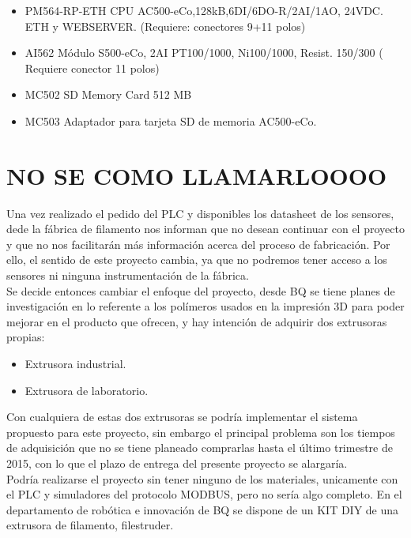 \begin{itemize}
	\item{PM564-RP-ETH CPU AC500-eCo,128kB,6DI/6DO-R/2AI/1AO, 24VDC. ETH y WEBSERVER. (Requiere: conectores 9+11 polos)}
	\item{AI562 Módulo S500-eCo, 2AI PT100/1000, Ni100/1000, Resist. 150/300 ( Requiere conector 11 polos)}
	\item{MC502 SD Memory Card 512 MB}
	\item{MC503 Adaptador para tarjeta SD de memoria AC500-eCo.}
\end{itemize}

\section{NO SE COMO LLAMARLOOOO}
\label{}

Una vez realizado el pedido del PLC y disponibles los datasheet de los sensores, dede la fábrica de filamento nos informan que no desean continuar con el proyecto y que no nos facilitarán más información acerca del proceso de fabricación. Por ello, el sentido de este proyecto cambia, ya que no podremos tener acceso a los sensores ni ninguna instrumentación de la fábrica.\\

Se decide entonces cambiar el enfoque del proyecto, desde BQ se tiene planes de investigación en lo referente a los polímeros usados en la impresión 3D para poder mejorar en el producto que ofrecen, y hay intención de adquirir dos extrusoras propias:

\begin{itemize}

		\item{Extrusora industrial.}
		\item{Extrusora de laboratorio.}
\end{itemize}

Con cualquiera de estas dos extrusoras se podría implementar el sistema propuesto para este proyecto, sin embargo el principal problema son los tiempos de adquisición que no se tiene planeado comprarlas hasta el último trimestre de 2015, con lo que el plazo de entrega del presente proyecto se alargaría.\\

Podría realizarse el proyecto sin tener ninguno de los materiales, unicamente con el PLC y simuladores del protocolo MODBUS, pero no sería algo completo. En el departamento de robótica e innovación de BQ se dispone de un KIT DIY de una extrusora de filamento, filestruder.\\

